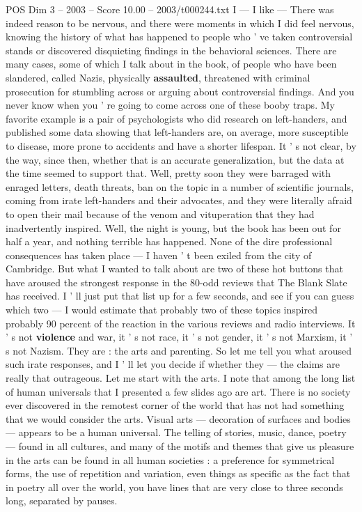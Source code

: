 \begin{textsample}{POS Dim 3 – 2003 – Score 10.00 – 2003/t000244.txt}
I — I like — There was indeed reason to be nervous, and there were moments in which I did feel nervous, knowing the history of what has happened to people who ' ve taken controversial stands or discovered disquieting findings in the behavioral sciences.
There are many cases, some of which I talk about in the book, of people who have been slandered, called Nazis, physically \textbf{assaulted}, threatened with criminal prosecution for stumbling across or arguing about controversial findings.
And you never know when you ' re going to come across one of these booby traps.
My favorite example is a pair of psychologists who did research on left-handers, and published some data showing that left-handers are, on average, more susceptible to disease, more prone to accidents and have a shorter lifespan.
It ' s not clear, by the way, since then, whether that is an accurate generalization, but the data at the time seemed to support that.
Well, pretty soon they were barraged with enraged letters, death threats, ban on the topic in a number of scientific journals, coming from irate left-handers and their advocates, and they were literally afraid to open their mail because of the venom and vituperation that they had inadvertently inspired.
Well, the night is young, but the book has been out for half a year, and nothing terrible has happened.
None of the dire professional consequences has taken place — I haven ' t been exiled from the city of Cambridge.
But what I wanted to talk about are two of these hot buttons that have aroused the strongest response in the 80-odd reviews that The Blank Slate has received.
I ' ll just put that list up for a few seconds, and see if you can guess which two — I would estimate that probably two of these topics inspired probably 90 percent of the reaction in the various reviews and radio interviews.
It ' s not \textbf{violence} and war, it ' s not race, it ' s not gender, it ' s not Marxism, it ' s not Nazism.
They are : the arts and parenting.
So let me tell you what aroused such irate responses, and I ' ll let you decide if whether they — the claims are really that outrageous.
Let me start with the arts.
I note that among the long list of human universals that I presented a few slides ago are art.
There is no society ever discovered in the remotest corner of the world that has not had something that we would consider the arts.
Visual arts — decoration of surfaces and bodies — appears to be a human universal.
The telling of stories, music, dance, poetry — found in all cultures, and many of the motifs and themes that give us pleasure in the arts can be found in all human societies : a preference for symmetrical forms, the use of repetition and variation, even things as specific as the fact that in poetry all over the world, you have lines that are very close to three seconds long, separated by pauses.

\end{textsample}
